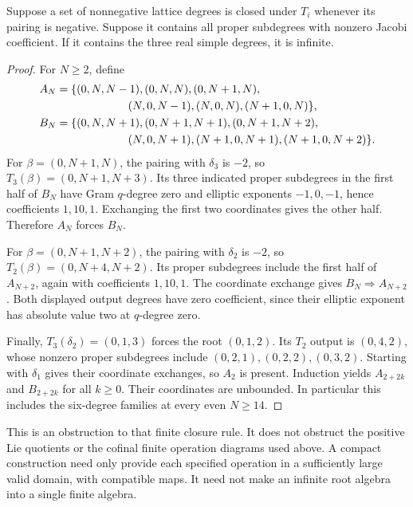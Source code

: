 \begin{proposition}
\label{prop:recognition-affine-staircase}
Suppose a set of nonnegative lattice degrees is closed under
$T_i$ whenever its pairing is negative. Suppose it contains all
proper subdegrees with nonzero Jacobi coefficient. If it
contains the three real simple degrees, it is infinite.
\end{proposition}
\begin{proof}
For $N\geq2$, define
\[
\begin{split}
 A_N={}&\{(0,N,N-1),(0,N,N),(0,N+1,N),\\
       &\hspace{18mm}(N,0,N-1),(N,0,N),(N+1,0,N)\},\\
 B_N={}&\{(0,N,N+1),(0,N+1,N+1),(0,N+1,N+2),\\
       &\hspace{18mm}(N,0,N+1),(N+1,0,N+1),(N+1,0,N+2)\}.
\end{split}
\]
For $\beta=(0,N+1,N)$, the pairing with $\delta_3$ is $-2$,
so $T_3(\beta)=(0,N+1,N+3)$.
Its three indicated proper subdegrees in the first half of $B_N$
have Gram $q$-degree zero and elliptic exponents $-1,0,-1$,
hence coefficients $1,10,1$. Exchanging the first two coordinates
gives the other half. Therefore $A_N$ forces $B_N$.

For $\beta=(0,N+1,N+2)$, the pairing with $\delta_2$ is $-2$,
so $T_2(\beta)=(0,N+4,N+2)$.
Its proper subdegrees include the first half of $A_{N+2}$,
again with coefficients $1,10,1$. The coordinate exchange gives
$B_N\Rightarrow A_{N+2}$. Both displayed output degrees have
zero coefficient, since their elliptic exponent has absolute
value two at $q$-degree zero.

Finally, $T_3(\delta_2)=(0,1,3)$ forces the root $(0,1,2)$.
Its $T_2$ output is $(0,4,2)$, whose nonzero proper subdegrees
include $(0,2,1),(0,2,2),(0,3,2)$. Starting with $\delta_1$
gives their coordinate exchanges, so $A_2$ is present.
Induction yields $A_{2+2k}$ and $B_{2+2k}$ for all $k\geq0$.
Their coordinates are unbounded. In particular this includes the
six-degree families at every even $N\geq14$.
\end{proof}

This is an obstruction to that finite closure rule. It does not
obstruct the positive Lie quotients or the cofinal finite operation
diagrams used above. A compact construction need only provide each
specified operation in a sufficiently large valid domain, with
compatible maps. It need not make an infinite root algebra into a
single finite algebra.

